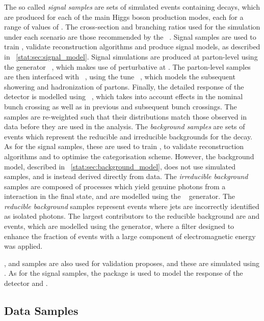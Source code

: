 The so called \emph{signal samples} are sets of simulated events containing \Hgg decays, which are produced for each of the main Higgs boson production modes, each for a range of values of \mH. The cross-section and branching ratios used for the simulation under each \mH scenario are those recommended by the \LHCHXSWG~\cite{LHCHXSWGYR4}. Signal samples are used to train \BDT\s, validate reconstruction algorithms and produce signal models, as described in \Sec~\ref{stat:sec:signal_model}. Signal simulations are produced at parton-level using the generator \Madgraph~\cite{Madgraph}, which makes use of perturbative \QCD at \NLO. The parton-level samples are then interfaced with \Pythia~\cite{Pythia8}, using the tune \PythiaTune~\cite{PythiaTune}, which models the subsequent showering and hadronization of partons. Finally, the detailed response of the \CMS detector is modelled using \Geant~\cite{Geant}, which takes into account \PU effects in the nominal bunch crossing as well as in previous and subsequent bunch crossings. The samples are re-weighted such that their \PU distributions match those observed in data before they are used in the analysis.
The \emph{background samples} are sets of events which represent the reducible and irreducible backgrounds for the \Hgg decay. As for the signal samples, these are used to train \BDT\s, to validate reconstruction algorithms and to optimise the categorisation scheme. However, the background model, described in \Sec~\ref{stat:sec:background_model}, does not use simulated samples, and is instead derived directly from data. The \emph{irreducible background} samples are composed of \SM processes which yield genuine photons from a \pp interaction in the final state, and are modelled using the \Sherpa~\cite{Sherpa} generator. The \emph{reducible background} samples represent events where jets are incorrectly identified as isolated photons. The largest contributors to the reducible background are \gammaJet and \QCDmultijet events, which are modelled using the \Pythia generator, where a filter designed to enhance the fraction of events with a large component of electromagnetic energy was applied. %

\DY, \Wg and \Zg samples are also used for validation proposes, and these are simulated using \Madgraph. As for the signal samples, the \Geant package is used to model the response of the \CMS detector and \PU.


\subsection{Data Samples} %

